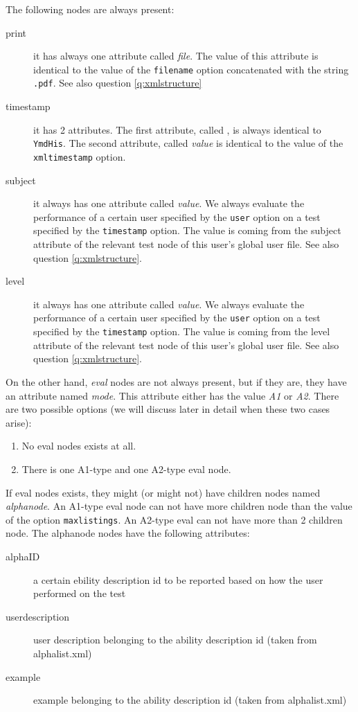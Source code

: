 \documentclass{scrartcl}
\begin{document}
The following nodes are always present:
\begin{description}
\item[print] it has always one attribute called \emph{file}. The value of this attribute is identical to the value of the \verb+filename+ option concatenated with the string \verb+.pdf+. See also question \ref{q:xmlstructure}
\item[timestamp] it has 2 attributes. The first attribute, called , is always identical to \verb+YmdHis+. The second attribute, called \emph{value} is identical to the value of the \verb+xmltimestamp+ option.
\item[subject] it always has one attribute called \emph{value}. We always evaluate the performance of a certain user specified by the \verb+user+ option on a test specified by the \verb+timestamp+ option. The value is coming from the subject attribute of the relevant test node of this user's global user file. See also question \ref{q:xmlstructure}.
\item[level] it always has one attribute called \emph{value}. We always evaluate the performance of a certain user specified by the \verb+user+ option on a test specified by the \verb+timestamp+ option. The value is coming from the level attribute of the relevant test node of this user's global user file. See also question \ref{q:xmlstructure}.
\end{description}
On the other hand, \emph{eval} nodes are not always present, but if they are, they have an attribute named \emph{mode}. This attribute either has the value \emph{A1} or \emph{A2}. There are two possible options (we will discuss later in detail when these two cases arise):
\begin{enumerate}
\item No eval nodes exists at all.
\item There is one A1-type and one A2-type eval node.
\end{enumerate}
If eval nodes exists, they might (or might not) have children nodes named \emph{alphanode}. An A1-type eval node can not have more children node than the value of the option \verb+maxlistings+. An A2-type eval can not have more than 2 children node. The alphanode nodes have the following attributes:
\begin{description}
\item[alphaID] a certain ebility description id to be reported based on how the user performed on the test
\item[userdescription] user description belonging to the ability description id (taken from alphalist.xml) 
\item[example] example belonging to the ability description id (taken from alphalist.xml)
\end{description}
\end{document}
